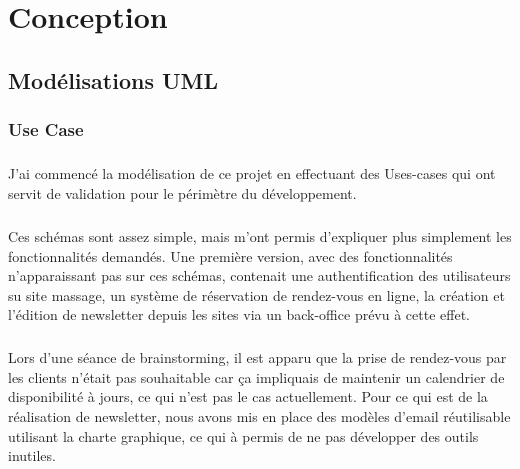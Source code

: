 \documentclass[11pt,a4paper]{report}
\begin{document}
\chapter{Conception}
	\section{Modélisations UML}
			\subsection{Use Case}
				\paragraph*{}J'ai commencé la modélisation de ce projet en effectuant des Uses-cases qui ont servit de validation pour le périmètre du développement.
				\paragraph*{}Ces schémas sont assez simple, mais m'ont permis d'expliquer plus simplement les fonctionnalités demandés. Une première version, avec des fonctionnalités n'apparaissant pas sur ces schémas, contenait une authentification des utilisateurs su site massage, un système de réservation de rendez-vous en ligne, la création et l'édition de newsletter depuis les sites via un back-office prévu à cette effet.
				\paragraph*{}Lors d'une séance de brainstorming, il est apparu que la prise de rendez-vous par les clients n'était pas souhaitable car ça impliquais de maintenir un calendrier de disponibilité à jours, ce qui n'est pas le cas actuellement. Pour ce qui est de la réalisation de newsletter, nous avons mis en place des modèles d'email réutilisable utilisant la charte graphique, ce qui à permis de ne pas développer des outils inutiles.
\end{document}
